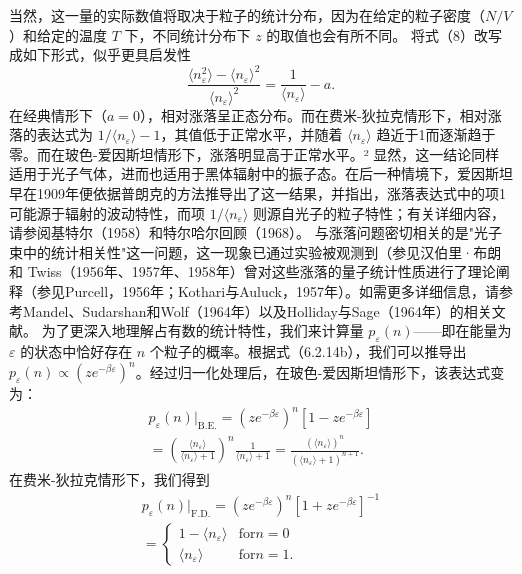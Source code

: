 当然，这一量的实际数值将取决于粒子的统计分布，因为在给定的粒子密度（\(N/V\)）和给定的温度 \(T\) 下，不同统计分布下 \(z\) 的取值也会有所不同。
将式（8）改写成如下形式，似乎更具启发性
\begin{equation}\tag{6.3.5}\label{eq:6.3.5}
\frac { \langle n _ { \varepsilon } ^{2} \rangle - \langle n _ { \varepsilon } \rangle ^{2} } { \langle n _ { \varepsilon } \rangle ^{2} } = \frac { 1 } { \langle n _ { \varepsilon } \rangle } - a .
\end{equation}
在经典情形下（\(a=0\)），相对涨落呈正态分布。而在费米-狄拉克情形下，相对涨落的表达式为 \(1/\langle n_{\varepsilon}\rangle-1\)，其值低于正常水平，并随着 \(\langle n_{\varepsilon}\rangle\) 趋近于1而逐渐趋于零。而在玻色-爱因斯坦情形下，涨落明显高于正常水平。² 显然，这一结论同样适用于光子气体，进而也适用于黑体辐射中的振子态。在后一种情境下，爱因斯坦早在1909年便依据普朗克的方法推导出了这一结果，并指出，涨落表达式中的项1可能源于辐射的波动特性，而项 \(1/\langle n_{\varepsilon}\rangle\) 则源自光子的粒子特性；有关详细内容，请参阅基特尔（1958）和特尔哈尔回顾（1968）。
与涨落问题密切相关的是"光子束中的统计相关性"这一问题，这一现象已通过实验被观测到（参见汉伯里·布朗和
Twiss（1956年、1957年、1958年）曾对这些涨落的量子统计性质进行了理论阐释（参见Purcell，1956年；Kothari与Auluck，1957年）。如需更多详细信息，请参考Mandel、Sudarshan和Wolf（1964年）以及Holliday与Sage（1964年）的相关文献。
为了更深入地理解占有数的统计特性，我们来计算量 \(p_{\varepsilon}(n)\)——即在能量为 \(\varepsilon\) 的状态中恰好存在 \(n\) 个粒子的概率。根据式（6.2.14b），我们可以推导出 \(p_{\varepsilon}(n) \propto (ze^{-\beta\varepsilon})^{n}\)。经过归一化处理后，在玻色-爱因斯坦情形下，该表达式变为：
\begin{equation}\tag{6.3.6}\label{eq:6.3.6}
\begin{array}{r} { p _ { \varepsilon } ( n ) | _ { \mathrm { B . E . } } = \left( z e ^{- \beta \varepsilon} \right) ^{n} \left[ 1 - z e ^{- \beta \varepsilon} \right] } \\{ = \left( \frac { \langle n _ { \varepsilon } \rangle } { \langle n _ { \varepsilon } \rangle + 1 } \right) ^{n} \frac { 1 } { \langle n _ { \varepsilon } \rangle + 1 } = \frac { ( \langle n _ { \varepsilon } \rangle ) ^{n} } { ( \langle n _ { \varepsilon } \rangle + 1 ) ^{n + 1} } . } \end{array}
\end{equation}
在费米-狄拉克情形下，我们得到
\begin{equation}\tag{6.3.7}\label{eq:6.3.7}
\begin{array}{r} { p _ { \varepsilon } ( n ) | _ { \mathrm { F . D . } } = \left( z e ^{- \beta \varepsilon} \right) ^{n} \left[ 1 + z e ^{- \beta \varepsilon} \right] ^{- 1} } \\{ = \left\{ \begin{array}{ll} { 1 - \langle n _ { \varepsilon } \rangle } & { \mathrm { f o r }  n = 0 } \\{ \langle n _ { \varepsilon } \rangle } & { \mathrm { f o r }  n = 1 . } \end{array} \right. } \end{array}
\end{equation}
